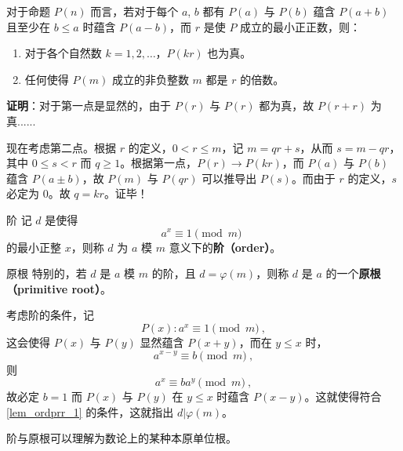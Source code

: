 
\begin{lemma}{}\label{lem_ordprr_1}
对于命题 $P(n)$ 而言，若对于每个 $a$, $b$ 都有 $P(a)$ 与 $P(b)$ 蕴含 $P(a+b)$ 且至少在 $b \le a$ 时蕴含 $P(a-b)$，而 $r$ 是使 $P$ 成立的最小正正数，则：
\begin{enumerate}
\item 对于各个自然数 $k = 1, 2, \dots$，$P(kr)$ 也为真。
\item 任何使得 $P(m)$ 成立的非负整数 $m$ 都是 $r$ 的倍数。
\end{enumerate}
\end{lemma}
\textbf{证明}：对于第一点是显然的，由于 $P(r)$ 与 $P(r)$ 都为真，故 $P(r+r)$ 为真......

现在考虑第二点。根据 $r$ 的定义，$0 < r \le m$，记 $m = qr + s$，从而 $s = m - qr$，其中 $0 \le s < r$ 而 $q \ge 1$。根据第一点，$P(r) \rightarrow P(kr)$，而 $P(a)$ 与 $P(b)$ 蕴含 $P(a \pm b)$，故 $P(m)$ 与 $P(qr)$ 可以推导出 $P(s)$。而由于 $r$ 的定义，$s$ 必定为 $0$。故 $q = kr$。证毕！


\begin{definition}{阶}
记 $d$ 是使得
\begin{equation}
a^x \equiv 1 \pmod m ~~
\end{equation}
的最小正整 $x$，则称 $d$ 为 $a$ 模 $m$ 意义下的\textbf{阶（order）}。
\end{definition}

\begin{definition}{原根}
特别的，若 $d$ 是 $a$ 模 $m$ 的阶，且 $d = \varphi(m)$，则称 $d$ 是 $a$ 的一个\textbf{原根（primitive root）}。
\end{definition}

考虑阶的条件，记
\begin{equation}
P(x) : a^x \equiv 1 \pmod m ~,
\end{equation}
这会使得 $P(x)$ 与 $P(y)$ 显然蕴含 $P(x+y)$，而在 $y \le x$ 时，
\begin{equation}
a^{x-y} \equiv b \pmod m ~,
\end{equation}
则
\begin{equation}
a^x \equiv b a^y \pmod m ~,
\end{equation}
故必定 $b=1$ 而 $P(x)$ 与 $P(y)$ 在 $y \le x$ 时蕴含 $P(x-y)$。这就使得符合\autoref{lem_ordprr_1} 的条件，这就指出 $d | \varphi(m)$。

阶与原根可以理解为数论上的某种本原单位根。
